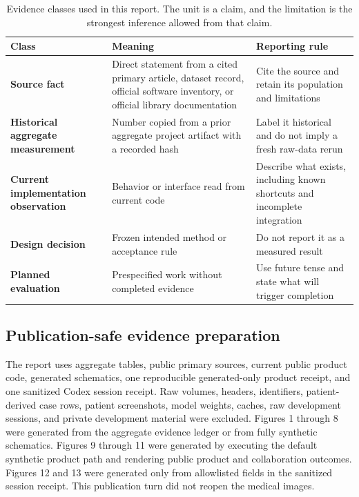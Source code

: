 \documentclass[11pt]{article}
\begin{document}
\begin{table}[H]
\centering
\caption{Evidence classes used in this report. The unit is a claim, and the limitation is the strongest inference allowed from that claim.}
\label{tab:evidence-classes}
\begin{tabularx}{\textwidth}{>{\bfseries}p{} X X}
\toprule
Class & Meaning & Reporting rule \\
\midrule
Source fact & Direct statement from a cited primary article, dataset record, official software inventory, or official library documentation & Cite the source and retain its population and limitations \\
Historical aggregate measurement & Number copied from a prior aggregate project artifact with a recorded hash & Label it historical and do not imply a fresh raw-data rerun \\
Current implementation observation & Behavior or interface read from current code & Describe what exists, including known shortcuts and incomplete integration \\
Design decision & Frozen intended method or acceptance rule & Do not report it as a measured result \\
Planned evaluation & Prespecified work without completed evidence & Use future tense and state what will trigger completion \\
\bottomrule
\end{tabularx}
\end{table}

\subsection{Publication-safe evidence preparation}

The report uses aggregate tables, public primary sources, current public product code, generated schematics, one reproducible generated-only product receipt, and one sanitized Codex session receipt. Raw volumes, headers, identifiers, patient-derived case rows, patient screenshots, model weights, caches, raw development sessions, and private development material were excluded. Figures 1 through 8 were generated from the aggregate evidence ledger or from fully synthetic schematics. Figures 9 through 11 were generated by executing the default synthetic product path and rendering public product and collaboration outcomes. Figures 12 and 13 were generated only from allowlisted fields in the sanitized session receipt. This publication turn did not reopen the medical images.
\end{document}
